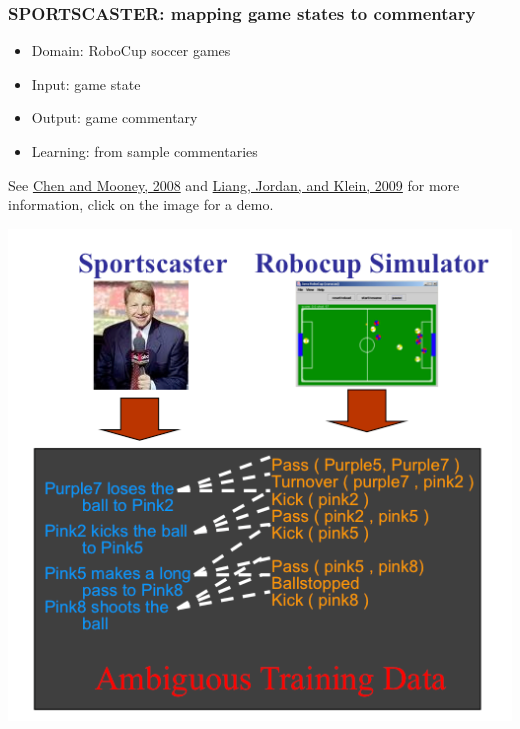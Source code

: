 \documentclass[ignorenonframetext]{beamer}
\begin{document}
\begin{frame}
\begin{columns}[c]
\end{columns}
\end{frame}

\begin{frame}\frametitle{SPORTSCASTER: mapping game states to commentary}

\begin{itemize}
\item Domain: RoboCup soccer games
\item Input: game state
\item Output: game commentary
\item Learning: from sample commentaries
\end{itemize}

See \href{http://www.cs.utexas.edu/~ai-lab/pub-view.php?PubID=126770}{Chen and Mooney, 2008} 
and \href{http://aclweb.org/anthology/P/P09/P09-1011.pdf}{Liang, Jordan, and Klein, 2009}
for more information, click on the image for a demo.

\begin{center}
\href{http://www.cs.utexas.edu/users/ml/clamp/sportscasting}{
\includegraphics[height=.5\textheight]{images/chen-sportscast.png}}
\end{center}
\end{frame}
\end{document}
